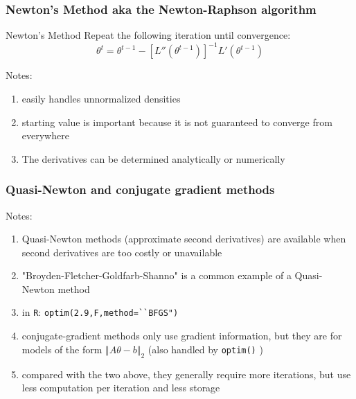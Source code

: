 \documentclass{beamer}
\begin{document}
\begin{frame}
\frametitle{Newton's Method aka the Newton-Raphson algorithm}


\begin{block}{Newton's Method}
Repeat the following iteration until convergence:
\[
\theta^{t} = \theta^{t-1} - [L''(\theta^{t-1})]^{-1} L'(\theta^{t-1} ) 
\]
\end{block}

Notes:
\begin{enumerate}
\item easily handles unnormalized densities
\item starting value is important because it is not guaranteed to converge from everywhere
\item The derivatives can be determined analytically or numerically
\end{enumerate}

\end{frame}

\begin{frame}[fragile]
\frametitle{Quasi-Newton and conjugate gradient methods}

Notes:
\begin{enumerate}
\item Quasi-Newton methods (approximate second derivatives) are available when second derivatives are too costly or unavailable
\item "Broyden-Fletcher-Goldfarb-Shanno" is a common example of a Quasi-Newton method
\item in \verb|R|: \verb|optim(2.9,F,method=``BFGS")|
\item conjugate-gradient methods only use gradient information, but they are for models of the form $\Vert A \theta - b \Vert_2$ (also handled by \verb|optim()| )
\item compared with the two above, they generally require more iterations, but use less computation per iteration and less storage
\end{enumerate}

\end{frame}
\end{document}
